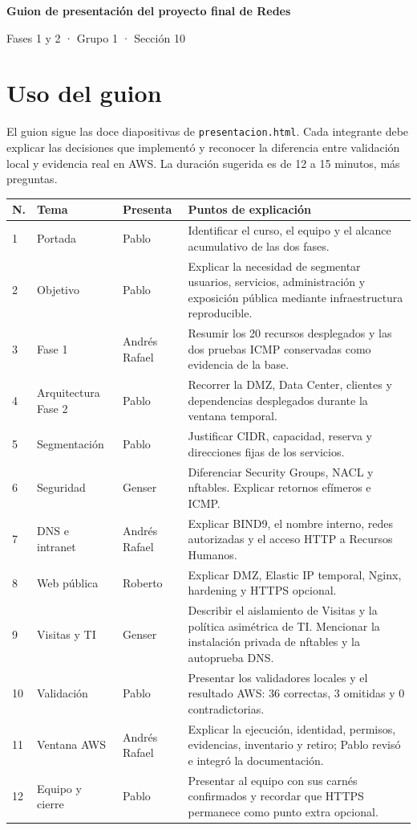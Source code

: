 \documentclass[11pt]{article}
\begin{document}
{\LARGE\bfseries\color{Navy}Guion de presentación del proyecto final de Redes}\par
{\large Fases 1 y 2 · Grupo 1 · Sección 10}

\section*{Uso del guion}

El guion sigue las doce diapositivas de \texttt{presentacion.html}. Cada integrante debe explicar
las decisiones que implementó y reconocer la diferencia entre validación local y evidencia real en
AWS. La duración sugerida es de 12 a 15 minutos, más preguntas.

\begin{longtable}{@{}p{1.1cm}p{3.6cm}p{2.8cm}p{7.1cm}@{}}
\toprule
\textbf{N.} & \textbf{Tema} & \textbf{Presenta} & \textbf{Puntos de explicación} \\
\midrule
1 & Portada & Pablo & Identificar el curso, el equipo y el alcance acumulativo de las dos fases. \\
2 & Objetivo & Pablo & Explicar la necesidad de segmentar usuarios, servicios, administración y exposición pública mediante infraestructura reproducible. \\
3 & Fase 1 & Andrés Rafael & Resumir los 20 recursos desplegados y las dos pruebas ICMP conservadas como evidencia de la base. \\
4 & Arquitectura Fase 2 & Pablo & Recorrer la DMZ, Data Center, clientes y dependencias desplegados durante la ventana temporal. \\
5 & Segmentación & Pablo & Justificar CIDR, capacidad, reserva y direcciones fijas de los servicios. \\
6 & Seguridad & Genser & Diferenciar Security Groups, NACL y nftables. Explicar retornos efímeros e ICMP. \\
7 & DNS e intranet & Andrés Rafael & Explicar BIND9, el nombre interno, redes autorizadas y el acceso HTTP a Recursos Humanos. \\
8 & Web pública & Roberto & Explicar DMZ, Elastic IP temporal, Nginx, hardening y HTTPS opcional. \\
9 & Visitas y TI & Genser & Describir el aislamiento de Visitas y la política asimétrica de TI. Mencionar la instalación privada de nftables y la autoprueba DNS. \\
10 & Validación & Pablo & Presentar los validadores locales y el resultado AWS: 36 correctas, 3 omitidas y 0 contradictorias. \\
11 & Ventana AWS & Andrés Rafael & Explicar la ejecución, identidad, permisos, evidencias, inventario y retiro; Pablo revisó e integró la documentación. \\
12 & Equipo y cierre & Pablo & Presentar al equipo con sus carnés confirmados y recordar que HTTPS permanece como punto extra opcional. \\
\bottomrule
\end{longtable}
\end{document}
